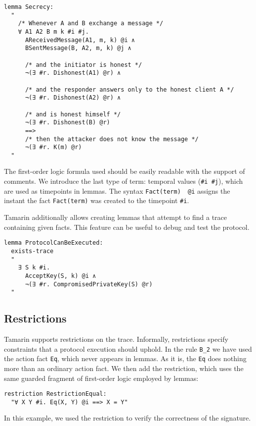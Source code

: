 \begin{lstlisting}
lemma Secrecy:
  "
    /* Whenever A and B exchange a message */
    ∀ A1 A2 B m k #i #j.
      AReceivedMessage(A1, m, k) @i ∧
      BSentMessage(B, A2, m, k) @j ∧

      /* and the initiator is honest */
      ¬(∃ #r. Dishonest(A1) @r) ∧

      /* and the responder answers only to the honest client A */
      ¬(∃ #r. Dishonest(A2) @r) ∧

      /* and is honest himself */
      ¬(∃ #r. Dishonest(B) @r)
      ==> 
      /* then the attacker does not know the message */
      ¬(∃ #r. K(m) @r)
  "
\end{lstlisting}

The first-order logic formula used should be easily readable with the support of comments. We introduce the last type of term: temporal values (\lstinline{#i #j}), which are used as timepoints in lemmas. The syntax \lstinline{Fact(term)  @i} assigns the instant the fact \lstinline{Fact(term)} was created to the timepoint \lstinline{#i}.

Tamarin additionally allows creating lemmas that attempt to find a trace containing given facts. This feature can be useful to debug and test the protocol.
\begin{lstlisting}
lemma ProtocolCanBeExecuted:
  exists-trace
  " 
    ∃ S k #i.
      AcceptKey(S, k) @i ∧
      ¬(∃ #r. CompromisedPrivateKey(S) @r)
  "
\end{lstlisting}

\subsection{Restrictions}

Tamarin supports restrictions on the trace. Informally, restrictions specify constraints that a protocol execution should uphold. In the rule \lstinline{B_2} we have used the action fact \lstinline{Eq}, which never appears in lemmas. As it is, the \lstinline{Eq} does nothing more than an ordinary action fact. We then add the restriction, which uses the same guarded fragment of first-order logic employed by lemmas:

\begin{lstlisting}
restriction RestrictionEqual:
  "∀ X Y #i. Eq(X, Y) @i ==> X = Y"
\end{lstlisting}

In this example, we used the restriction to verify the correctness of the signature.

